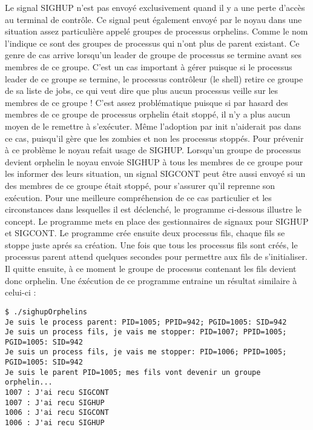 Le signal SIGHUP n’est pas envoyé exclusivement quand il y a une perte d’accès au terminal de contrôle. Ce signal peut également envoyé par le noyau dans une situation assez particulière appelé groupes 
de processus orphelins. Comme le nom l’indique ce sont des groupes de processus qui n’ont plus de parent existant. Ce genre de cas arrive lorsqu’un leader de groupe de processus se termine avant ses membres de 
ce groupe. 
\newline
C’est un cas important à gérer puisque si le processus leader de ce groupe se termine, le processus contrôleur (le shell) retire ce groupe de sa liste de jobs, ce qui veut dire que plus aucun processus veille 
sur les membres de ce groupe ! C’est assez problématique puisque si par hasard des membres de ce groupe de processus orphelin était stoppé, il n’y a plus aucun moyen de le remettre à s’exécuter. Même l’adoption par 
init n’aiderait pas dans ce cas, puisqu’il gère que les zombies et non les processus stoppés.
\newline
Pour prévenir à ce problème le noyau refait usage de SIGHUP. Lorsqu’un groupe de processus devient orphelin le noyau envoie SIGHUP à tous les membres de ce groupe pour les informer des leurs situation, un signal 
SIGCONT peut être aussi envoyé si un des membres de ce groupe était stoppé, pour s’assurer qu’il reprenne son exécution. 
\newline
\newline
Pour une meilleure compréhension de ce cas particulier et les circonstances dans lesquelles il est déclenché, le programme ci-dessous illustre le concept.
Le programme mets en place des gestionnaires de signaux pour SIGHUP et SIGCONT. Le programme crée ensuite deux processus fils, chaque fils se stoppe juste aprés sa création.
\newline
Une fois que tous les processus fils sont créés, le processus parent attend quelques secondes pour permettre aux fils de s'initialiser. Il quitte ensuite, à ce moment le groupe de processus contenant les fils devient donc orphelin. 
\newline
Une éxécution de ce programme entraine un résultat similaire à celui-ci :
\begin{lstlisting}[style=blackstyle]
$ ./sighupOrphelins
Je suis le process parent: PID=1005; PPID=942; PGID=1005: SID=942
Je suis un process fils, je vais me stopper: PID=1007; PPID=1005; PGID=1005: SID=942
Je suis un process fils, je vais me stopper: PID=1006; PPID=1005; PGID=1005: SID=942
Je suis le parent PID=1005; mes fils vont devenir un groupe orphelin...
1007 : J'ai recu SIGCONT
1007 : J'ai recu SIGHUP
1006 : J'ai recu SIGCONT
1006 : J'ai recu SIGHUP
\end{lstlisting}


